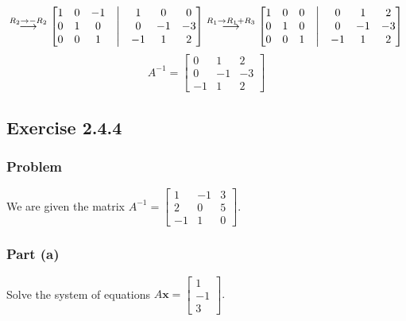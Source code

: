 \documentclass[12pt]{article}
\begin{document}
\[
  \overset{R_2 \rightarrow -R_2}{\longrightarrow}
  \begin{bmatrix}
    1 & 0 & -1 & \bigm| & 1 & 0 & 0\\ 
    0 & 1 & 0 & \bigm| & 0 & -1 & -3\\ 
    0 & 0 & 1 & \bigm| & -1 & 1 & 2 
  \end{bmatrix}
  \overset{R_1 \rightarrow R_1 + R_3}{\longrightarrow}
  \begin{bmatrix}
    1 & 0 & 0 & \bigm| & 0 & 1 & 2\\ 
    0 & 1 & 0 & \bigm| & 0 & -1 & -3\\ 
    0 & 0 & 1 & \bigm| & -1 & 1 & 2 
  \end{bmatrix}
\]
\vspace{0.25in}
\[
  A^{-1} = 
  \begin{bmatrix}
    0 & 1 & 2\\ 
    0 & -1 & -3\\ 
    -1 & 1 & 2 
  \end{bmatrix}
\]
\vspace{2in}
\subsection*{Exercise 2.4.4}
\vspace{0.25in}
\subsubsection*{Problem}
We are given the matrix
$A^{-1} =  
\begin{bmatrix}
  1 & -1 & 3\\ 
  2 & 0 & 5\\ 
  -1 & 1 & 0 
\end{bmatrix}
$. 
\vspace{0.25in}
\subsubsection*{Part (a)}
Solve the system of equations
$A\textbf{x} = 
\begin{bmatrix}
  1\\ 
  -1\\ 
  3 
\end{bmatrix}.
$ 
\vspace{0.25in}
\end{document}
